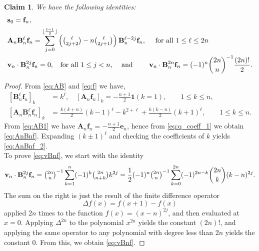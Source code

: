 \documentclass[12pt]{article}
\newtheorem{claim}[theorem]{Claim}
\theoremstyle{definition} %
\theoremstyle{remark} %
\newcommand{\ind}{\mathbf 1}
\newcommand{\yahui}[1]{\textcolor{blue}{\tt{#1}}}
\begin{document}
\begin{claim} We have the following identities:
   \label{cl:vAnBnf}
    \begin{align}
      \label{eq:AnBnf}
            &\mathbf{s}_0= \mathbf{f}_n, \\
            &\mathbf{A}_n \mathbf{B}^{\ell}_n \mathbf{f}_n=\sum_{j=0}^{\lfloor \frac{\ell-1}{2}\rfloor} \left(\tbinom{\ell}{2j+2}-n\tbinom{\ell}{2j+1}\right)\mathbf{B}^{\ell-2j}_n\mathbf{f}_n, \quad \text{ for all $1\le \ell \le 2n$}
           \label{eq:AnBnf_2}
          \\
          \label{eq:vBnf}
          &\mathbf{v}_n\cdot \mathbf{B}^{2j}_n \mathbf{f}_n = 0,\;\; \text{ for all $1\le j<n$, \quad and }\qquad \mathbf{v}_n\cdot \mathbf{B}^{2n}_n \mathbf{f}_n = (-1)^n \binom{2n}{n}^{-1}\frac{(2n)!}{2}.
    \end{align}
    \end{claim}
\begin{proof}
From \eqref{eq:AB} and \eqref{eq:f} we have, 
\begin{align}\label{eq:AB1}
[\mathbf{B}^{\ell}_n \mathbf{f}_n]_k &= k^{\ell}, \quad
[\mathbf{A}_n \mathbf{f}_n]_k =-\frac{n+1}{2} \ind(k=1),
\qquad 1\le k\le n,\\
    [\mathbf{A}_n \mathbf{B}^\ell_n\mathbf{f}_n]_k&=\frac{k(k+n)}{2}(k-1)^\ell-k^{2+\ell}+\frac{k(k-n)}{2}(k+1)^\ell, \qquad 1\le k\le n.\label{eq:AB2}
\end{align}
From \eqref{eq:AB1} we have $\mathbf{A}_n \mathbf{f}_n=-\tfrac{n+1}{2}\mathbf{e}_n$, hence from \eqref{eq:q_coeff_1} we obtain  \eqref{eq:AnBnf}. Expanding $(k\pm 1)^\ell$ and checking the coefficients of $k$ yields \eqref{eq:AnBnf_2}. \\
To prove \eqref{eq:vBnf}, we start with the identity
    \begin{align*}
        \mathbf{v}_n\cdot \mathbf{B}^{2 j}_n \mathbf{f}_n  = \tbinom{2n}{n}^{-1} \sum_{k=1}^n (-1)^k \tbinom{2n}{n+k} k^{2j}  = \frac12 (-1)^n\tbinom{2n}{n}^{-1} \sum_{k=0}^{2n}(-1)^{2n-k} \binom{2n}{k} (k-n)^{2j}.
    \end{align*}
The sum on the right is just the result of the finite difference operator \[\Delta f(x)=f(x+1)-f(x)\] applied $2n$ times to the function  $f(x)=(x-n)^{2j}$, and then evaluated at $x=0$. 
Applying $\Delta^{2n}$ to the polynomial $x^{2n}$ yields the constant $(2n)!$, and applying the same operator to any polynomial with degree less than $2n$ yields the constant 0.  From this, we obtain \eqref{eq:vBnf}.
\end{proof}
\end{document}
